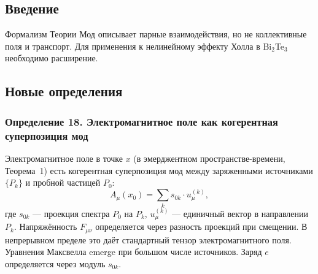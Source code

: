 \documentclass[12pt,a4paper]{article}
\begin{document}
\begin{abstract}
Формализм Теории Мод в текущей формулировке описывает частицы и их парные взаимодействия через моды, однако не содержит описания коллективных электромагнитных полей, кристаллических структур и транспорта заряда. Для применения теории к таким явлениям, как нелинейный эффект Холла с T-симметрией в теллуриде висмута, необходимо расширение формализма. В данной работе вводятся определения для внешнего электромагнитного поля как когерентного состояния мод, кристалла как периодической сети мод, транспорта заряда как эволюции собственной моды электрона и магнитного поля как топологической характеристики сети. Все определения согласованы с аксиоматикой исходной теории. На основе расширенного формализма формулируется проверяемое предсказание для нелинейного эффекта Холла с T-симметрией в теллуриде висмута: резонансное усиление нелинейного тока при когерентной накачке.

\bigskip
\noindent\textbf{Ключевые слова:} Теория Мод, электромагнитное поле, кристалл, транспорт заряда, эффект Холла, топологический изолятор, T-симметрия.
\end{abstract}

\subsection{Введение}
Формализм Теории Мод описывает парные взаимодействия, но не коллективные поля и транспорт. Для применения к нелинейному эффекту Холла в Bi$_2$Te$_3$ необходимо расширение.

\subsection{Новые определения}

\subsubsection{Определение 18. Электромагнитное поле как когерентная суперпозиция мод}
Электромагнитное поле в точке $x$ (в эмерджентном пространстве-времени, Теорема~1) есть когерентная суперпозиция мод между заряженными источниками $\{P_k\}$ и пробной частицей $P_0$:
\begin{equation}
    A_\mu(x_0) = \sum_{k} s_{0k} \cdot u_\mu^{(k)},
\end{equation}
где $s_{0k}$ --- проекция спектра $P_0$ на $P_k$, $u_\mu^{(k)}$ --- единичный вектор в направлении $P_k$. Напряжённость $F_{\mu\nu}$ определяется через разность проекций при смещении. В непрерывном пределе это даёт стандартный тензор электромагнитного поля. Уравнения Максвелла emerge при большом числе источников. Заряд $e$ определяется через модуль $s_{0k}$.
\end{document}
